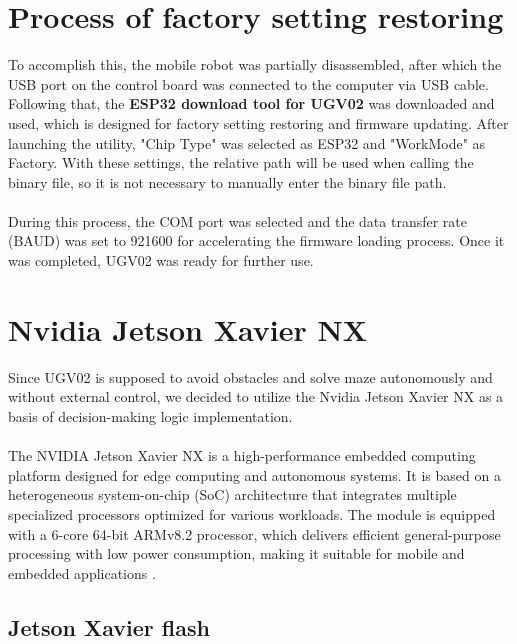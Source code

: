 \documentclass[]{IEEEphot}
\begin{document}
\section{Process of factory setting restoring}

To accomplish this, the mobile robot was partially disassembled, after which the USB port on the control board was connected to the computer via USB cable. Following that, the \textbf{ESP32 download tool for UGV02} was downloaded and used, which is designed for factory setting restoring and firmware updating. After launching the utility, "Chip Type" was selected as ESP32 and "WorkMode" as Factory. With these settings, the relative path will be used when calling the binary file, so it is not necessary to manually enter the binary file path. 
\\\\
During this process, the COM port was selected and the data transfer rate (BAUD) was set to 921600 for accelerating the firmware loading process. Once it was completed, UGV02 was ready for further use.

\section{Nvidia Jetson Xavier NX}

Since UGV02 is supposed to avoid obstacles and solve maze autonomously and without external control, we decided to utilize the Nvidia Jetson Xavier NX as a basis of decision-making logic implementation. 
\\\\
The NVIDIA Jetson Xavier NX is a high-performance embedded computing platform designed for edge computing and autonomous systems. It is based on a heterogeneous system-on-chip (SoC) architecture that integrates multiple specialized processors optimized for various workloads. The module is equipped with a 6-core 64-bit ARMv8.2 processor, which delivers efficient general-purpose processing with low power consumption, making it suitable for mobile and embedded applications \cite{jetson_blog, jetson_series}.    

\subsection{Jetson Xavier flash}
\end{document}
